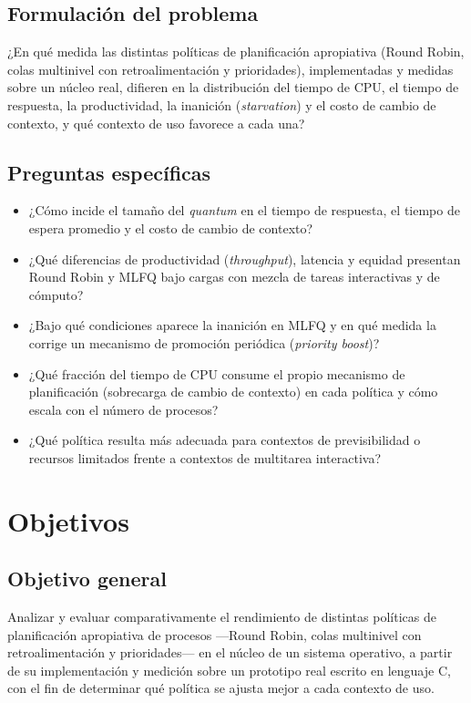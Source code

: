 \subsection{Formulación del problema}
¿En qué medida las distintas políticas de planificación apropiativa (Round
Robin, colas multinivel con retroalimentación y prioridades), implementadas y
medidas sobre un núcleo real, difieren en la distribución del tiempo de CPU, el
tiempo de respuesta, la productividad, la inanición (\emph{starvation}) y el
costo de cambio de contexto, y qué contexto de uso favorece a cada una?

\subsection{Preguntas específicas}
\begin{itemize}
  \item ¿Cómo incide el tamaño del \emph{quantum} en el tiempo de respuesta, el
    tiempo de espera promedio y el costo de cambio de contexto?
  \item ¿Qué diferencias de productividad (\emph{throughput}), latencia y
    equidad presentan Round Robin y MLFQ bajo cargas con mezcla de tareas
    interactivas y de cómputo?
  \item ¿Bajo qué condiciones aparece la inanición en MLFQ y en qué medida la
    corrige un mecanismo de promoción periódica (\emph{priority boost})?
  \item ¿Qué fracción del tiempo de CPU consume el propio mecanismo de
    planificación (sobrecarga de cambio de contexto) en cada política y cómo
    escala con el número de procesos?
  \item ¿Qué política resulta más adecuada para contextos de previsibilidad o
    recursos limitados frente a contextos de multitarea interactiva?
\end{itemize}

\section{Objetivos}

\subsection{Objetivo general}
Analizar y evaluar comparativamente el rendimiento de distintas políticas de
planificación apropiativa de procesos —Round Robin, colas multinivel con
retroalimentación y prioridades— en el núcleo de un sistema operativo, a partir
de su implementación y medición sobre un prototipo real escrito en lenguaje C,
con el fin de determinar qué política se ajusta mejor a cada contexto de uso.

